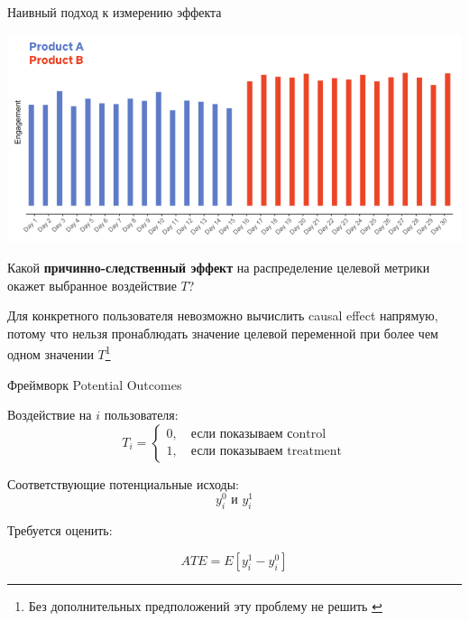 \documentclass[11pt,aspectratio=169,handout]{beamer}
\begin{document}
\begin{frame}{Наивный подход к измерению эффекта}
\begin{center}
\includegraphics[scale=0.3]{images/noexp.png}
\end{center}
\end{frame}

\begin{frame}{}

\begin{tcolorbox}[colback=info!5,colframe=info!80,title=Задача]
Какой {\bf причинно-следственный эффект} на распределение целевой метрики окажет выбранное воздействие $T$?
\end{tcolorbox}

\vfill

\begin{tcolorbox}[colback=warn!5,colframe=warn!80,title=Фундаментальная Проблема Causal Inference]
Для конкретного пользователя невозможно вычислить causal effect напрямую, потому что нельзя пронаблюдать значение целевой переменной при более чем одном значении $T$\footnote{Без дополнительных предположений эту проблему не решить \cite{GELMAN}}
\end{tcolorbox}

\end{frame}

\begin{frame}{Фреймворк Potential Outcomes}

Воздействие на $i$ пользователя:
\[
T_i = \begin{cases}
0, \quad \text{если показываем сontrol} \\
1, \quad \text{если показываем treatment}
\end{cases}
\]

Соответствующие потенциальные исходы:
\[
y_i^0 \text{ и } y_i^1
\]

Требуется оценить:
\begin{tcolorbox}[colback=info!5,colframe=info!80,title=Average Treatment Effect,center,width=6cm,center title]
\[
ATE = E \left[ y_i^1 - y_i^0 \right]
\]
\end{tcolorbox}

\end{frame}
\end{document}
